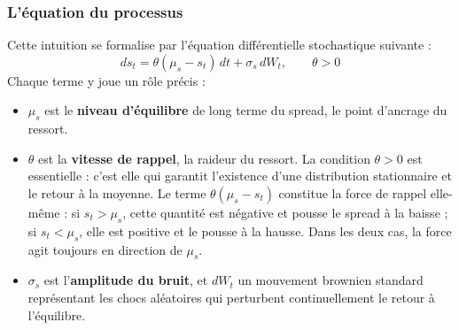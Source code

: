 \documentclass{article}
\begin{document}
\subsubsection*{L'équation du processus}
Cette intuition se formalise par l'équation différentielle stochastique suivante :
\begin{equation}
ds_t = \theta(\mu_s - s_t)\,dt + \sigma_s\,dW_t, \qquad \theta>0
\label{eq:ou}
\end{equation}
Chaque terme y joue un rôle précis :
\begin{itemize}
\item $\mu_s$ est le \textbf{niveau d'équilibre} de long terme du spread, le point d'ancrage du ressort.
\item $\theta$ est la \textbf{vitesse de rappel}, la raideur du ressort. La condition $\theta>0$ est essentielle : c'est elle qui garantit l'existence d'une distribution stationnaire et le retour à la moyenne. Le terme $\theta(\mu_s - s_t)$ constitue la force de rappel elle-même : si $s_t > \mu_s$, cette quantité est négative et pousse le spread à la baisse ; si $s_t < \mu_s$, elle est positive et le pousse à la hausse. Dans les deux cas, la force agit toujours en direction de $\mu_s$.
\item $\sigma_s$ est l'\textbf{amplitude du bruit}, et $dW_t$ un mouvement brownien standard représentant les chocs aléatoires qui perturbent continuellement le retour à l'équilibre.
\end{itemize}
\end{document}
